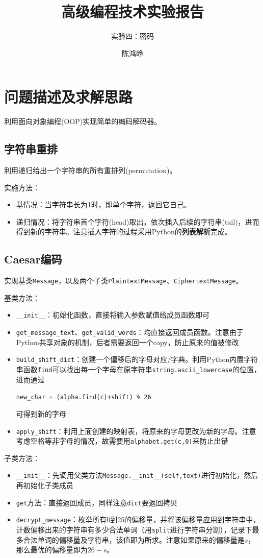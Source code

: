\documentclass[logo,reportComp]{thesis}
\title{高级编程技术实验报告}
\subtitle{实验四：密码}
\author{陈鸿峥}
\begin{document}
\maketitle

\section{问题描述及求解思路}
利用面向对象编程(OOP)实现简单的编码解码器。

\subsection{字符串重排}
利用递归给出一个字符串的所有重排列(permutation)。

实施方法：
\begin{itemize}
	\item 基情况：当字符串长为1时，即单个字符，返回它自己。
	\item 递归情况：将字符串首个字符(head)取出，依次插入后续的字符串(tail)，进而得到新的字符串。注意插入字符的过程采用Python的\textbf{列表解析}完成。
\end{itemize}

\subsection{Caesar编码}
实现基类\verb'Message'，以及两个子类\verb'PlaintextMessage'、\verb'CiphertextMessage'。

基类方法：
\begin{itemize}
	\item \verb'__init__'：初始化函数，直接将输入参数赋值给成员函数即可
	\item \verb'get_message_text'、\verb'get_valid_words'：均直接返回成员函数。注意由于Python共享对象的机制，后者需要返回一个copy，防止原来的值被修改
	\item \verb'build_shift_dict'：创建一个偏移后的字母对应/字典。利用Python内置字符串函数\verb'find'可以找出每一个字母在原字符串\verb'string.ascii_lowercase'的位置，进而通过
	\begin{center}\verb'new_char = (alpha.find(c)+shift) % 26'\end{center}
	可得到新的字母
	\item \verb'apply_shift'：利用上面创建的映射表，将原来的字母更改为新的字母。注意考虑空格等非字母的情况，故需要用\verb'alphabet.get(c,0)'来防止出错
\end{itemize}

子类方法：
\begin{itemize}
	\item \verb'__init__'：先调用父类方法\verb'Message.__init__(self,text)'进行初始化，然后再初始化子类成员
	\item \verb'get'方法：直接返回成员，同样注意\verb'dict'要返回拷贝
	\item \verb'decrypt_message'：枚举所有0到25的偏移量，并将该偏移量应用到字符串中，计数偏移出来的字符串有多少合法单词（用\verb'split'进行字符串分割），记录下最多合法单词的偏移量及字符串，该值即为所求。注意如果原来的偏移量是$s$，那么最优的偏移量即为$26-s$。
\end{itemize}
\end{document}
